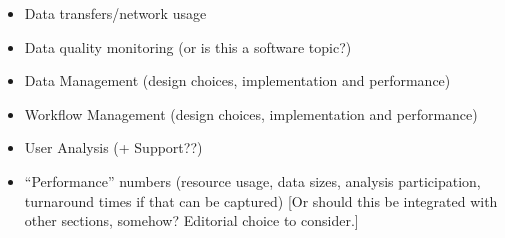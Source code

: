 \documentclass [draft,notitlepage] {article}
\begin{document}
\begin{itemize}
\item Data transfers/network usage



\item Data quality monitoring (or is this a software topic?)


\item Data Management (design choices, implementation and performance)


\item Workflow Management (design choices, implementation and performance)


\item User Analysis (+ Support??)


\item ``Performance'' numbers (resource usage, data sizes, analysis participation, turnaround times if that can be captured) [Or should this be integrated with other sections, somehow?  Editorial choice to consider.]


\end{itemize}
\end{document}
